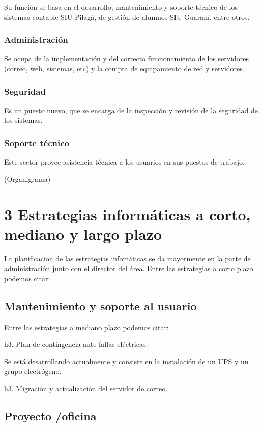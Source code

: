 \documentclass[a4paper,11pt,oneside]{article}
\begin{document}
Su función se basa en el desarrollo, mantenimiento y soporte técnico de los sistemas contable SIU Pilagá, de gestión de alumnos SIU Guaraní, entre otros.

\subsubsection*{Administración}

Se ocupa de la implementación y del correcto funcionamiento de los servidores (correo, web, sistemas, etc) y la compra de equipamiento de red y servidores.

\subsubsection*{Seguridad}

Es un puesto nuevo, que se encarga de la inspección y revisión de la seguridad de los sistemas.

\subsubsection*{Soporte técnico}

Este sector provee asistencia técnica a los usuarios en sus puestos de trabajo.

(Organigrama)

\section*{3 Estrategias informáticas a corto, mediano y largo plazo}


La planificacion de las estrategias infomáticas se da mayormente en la parte de administración junto con el director del área. 
Entre las estrategias a corto plazo podemos citar:

\subsection*{Mantenimiento y soporte al usuario}

Entre las estrategias a mediano plazo podemos citar:

h3. Plan de contingencia ante fallas eléctricas.

Se está desarrollando actualmente y consiste en la instalación de un UPS y un grupo electrógeno.

h3. Migración y actualización del servidor de correo.

\subsection*{Proyecto /oficina}
\end{document}
